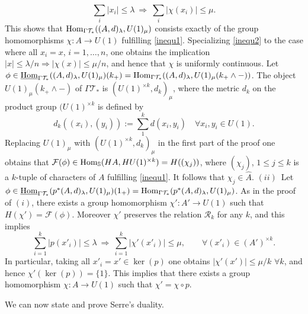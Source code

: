 \documentclass[cupthm]{CUP-JNL-JMJ}
\numberwithin{equation}{section}
\theoremstyle{cupplain}
\theoremstyle{cupdefinition}
\theoremstyle{cupremark}
\theoremstyle{cupproof}
\def\S{{\mathbb S}}
\def\cF{{\mathcal F}}
\def\cR{{\mathcal R}}
\def\cT{{\mathcal T}}
\def\sss{{\S}}
\def\Hom {{\rm{Hom}}}
\def\uhom{{\underline \Hom}}
\begin{document}
	\begin{equation}\label{inequ2}
	\sum_i \vert x_{i}\vert \leq \lambda~ \Rightarrow ~\sum_{i} \vert \chi(x_{i})\vert \leq \mu.
	\end{equation}
	This shows that $\Hom_{\Gamma\cT_*}((A,d)_\lambda,U(1)_\mu)$ consists exactly of the group homomorphisms $\chi:A\to U(1)$ fulfilling \eqref{inequ1}. Specializing \eqref{inequ2} to the case where all $x_i=x$, $i=1,\ldots, n$,  one obtains the implication $\vert x\vert \leq \lambda/n \Rightarrow \vert \chi(x)\vert \leq \mu/n $, and hence that $\chi$ is uniformly continuous. Let $\phi\in\uhom_{\Gamma\cT_*}((A,d)_\lambda,U(1)_\mu)(k_+)=\Hom_{\Gamma\cT_*}((A,d)_\lambda,U(1)_\mu(k_+\wedge -))$. The object $U(1)_\mu(k_+\wedge -)$ of $\Gamma\cT_*$ is $(U(1)^{\times k},d_k)_\mu$, where the metric $d_k$ on the product group $(U(1)^{\times k}$ is defined by
	\[
	d_k((x_i),(y_i)):=\sum_1^kd(x_i,y_i)\quad\forall x_i,y_i \in U(1).
	\]
	Replacing $U(1)_\mu$ with $(U(1)^{\times k},d_k)_\mu$ in the first part of the proof one obtains that $\cF(\phi)\in \Hom_\sss(HA,HU(1)^{\times k})=H((\chi_j))$, where $(\chi_j)$, $1\leq j\leq k$ is a $k$-tuple of  characters of $A$ fulfilling \eqref{inequ1}. It follows that $\chi_j\in \widehat A$.\newline
	$(ii)$~Let $\phi\in\uhom_{\Gamma\cT_*}(p^*(A,d)_\lambda,U(1)_\mu)(1_+)=\Hom_{\Gamma\cT_*}(p^*(A,d)_\lambda,U(1)_\mu)$. As in the proof of $(i)$, there exists a group homomorphism $\chi': A'\to U(1)$ such that $H(\chi')=\cF(\phi)$. Moreover $\chi'$ preserves the relation $\cR_k$ for any $k$, and this implies 
	\[
	 \sum_{i=1}^k \vert p(x'_i)\vert \leq \lambda ~\Rightarrow~ \sum_{i=1}^k \vert \chi'(x'_i)\vert \leq \mu, \qquad \forall (x'_i)\in (A')^{\times k}.
	\]
	In particular, taking all $x'_i =x'\in \ker(p)$ one obtains $\vert \chi'(x')\vert\leq \mu/k $ $\forall k$, and hence 
	$\chi'(\ker(p))=\{1\}$. This implies that there exists a group homomorphism $\chi:A\to U(1)$ such that $\chi'=\chi\circ p$. 
	\endproof 
	
We can now state and prove Serre's duality.
	
\end{document}

